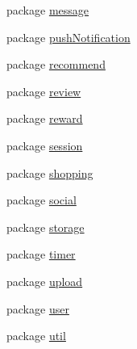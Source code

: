 \begin{DoxyCompactItemize}
\item 
package \hyperlink{namespacecom_1_1shephertz_1_1app42_1_1paas_1_1sdk_1_1csharp_1_1message}{message}
\item 
package \hyperlink{namespacecom_1_1shephertz_1_1app42_1_1paas_1_1sdk_1_1csharp_1_1push_notification}{push\+Notification}
\item 
package \hyperlink{namespacecom_1_1shephertz_1_1app42_1_1paas_1_1sdk_1_1csharp_1_1recommend}{recommend}
\item 
package \hyperlink{namespacecom_1_1shephertz_1_1app42_1_1paas_1_1sdk_1_1csharp_1_1review}{review}
\item 
package \hyperlink{namespacecom_1_1shephertz_1_1app42_1_1paas_1_1sdk_1_1csharp_1_1reward}{reward}
\item 
package \hyperlink{namespacecom_1_1shephertz_1_1app42_1_1paas_1_1sdk_1_1csharp_1_1session}{session}
\item 
package \hyperlink{namespacecom_1_1shephertz_1_1app42_1_1paas_1_1sdk_1_1csharp_1_1shopping}{shopping}
\item 
package \hyperlink{namespacecom_1_1shephertz_1_1app42_1_1paas_1_1sdk_1_1csharp_1_1social}{social}
\item 
package \hyperlink{namespacecom_1_1shephertz_1_1app42_1_1paas_1_1sdk_1_1csharp_1_1storage}{storage}
\item 
package \hyperlink{namespacecom_1_1shephertz_1_1app42_1_1paas_1_1sdk_1_1csharp_1_1timer}{timer}
\item 
package \hyperlink{namespacecom_1_1shephertz_1_1app42_1_1paas_1_1sdk_1_1csharp_1_1upload}{upload}
\item 
package \hyperlink{namespacecom_1_1shephertz_1_1app42_1_1paas_1_1sdk_1_1csharp_1_1user}{user}
\item 
package \hyperlink{namespacecom_1_1shephertz_1_1app42_1_1paas_1_1sdk_1_1csharp_1_1util}{util}
\end{DoxyCompactItemize}
